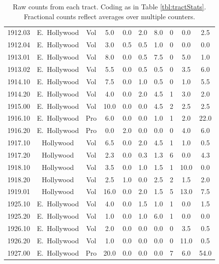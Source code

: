 \documentclass[11pt,twocolumn]{article}
\begin{document}
\begin{table}[]
\begin{tabular}{cccccccccc}
1912.03 & E.~Hollywood & Vol &  5.0 &  0.0 &  2.0 &  8.0 & 0 &  0.0 &  2.5 \\
1912.04 & E.~Hollywood & Vol &  3.0 &  0.5 &  0.5 &  1.0 & 0 &  0.0 &  0.0 \\
1913.01 & E.~Hollywood & Vol &  8.0 &  0.0 &  0.5 &  7.5 & 0 &  5.0 &  1.0 \\
1913.02 & E.~Hollywood & Vol &  5.5 &  0.0 &  0.5 &  0.5 & 0 &  3.5 &  6.0 \\
1914.10 & E.~Hollywood & Vol &  7.5 &  0.0 &  1.0 &  0.5 & 0 &  1.0 &  5.5 \\
1914.20 & E.~Hollywood & Vol &  4.0 &  0.0 &  2.0 &  4.5 & 1 &  3.0 &  2.0 \\
1915.00 & E.~Hollywood & Vol & 10.0 &  0.0 &  0.0 &  4.5 & 2 &  2.5 &  2.5 \\
1916.10 & E.~Hollywood & Pro &  6.0 &  0.0 &  0.0 &  1.0 & 1 &  2.0 & 22.0 \\
1916.20 & E.~Hollywood & Pro &  0.0 &  2.0 &  0.0 &  0.0 & 0 &  4.0 &  6.0 \\
1917.10 & Hollywood & Vol &  6.5 &  0.0 &  2.0 &  4.5 & 1 &  1.0 &  0.5 \\
1917.20 & Hollywood & Vol &  2.3 &  0.0 &  0.3 &  1.3 & 6 &  0.0 &  4.3 \\
1918.10 & Hollywood & Vol &  3.5 &  0.0 &  1.0 &  1.5 & 1 & 10.0 &  0.0 \\
1918.20 & Hollywood & Vol &  2.5 &  1.0 &  0.0 &  2.5 & 2 &  1.5 &  2.0 \\
1919.01 & Hollywood & Vol & 16.0 &  0.0 &  2.0 &  1.5 & 5 & 13.0 &  7.5 \\
1925.10 & E.~Hollywood & Vol &  4.0 &  0.0 &  1.5 &  1.0 & 1 &  0.0 &  1.5 \\
1925.20 & E.~Hollywood & Vol &  1.0 &  0.0 &  1.0 &  6.0 & 1 &  0.0 &  0.0 \\
1926.10 & E.~Hollywood & Vol &  2.0 &  0.0 &  0.0 &  0.0 & 0 &  3.5 &  0.5 \\
1926.20 & E.~Hollywood & Vol &  1.0 &  0.0 &  0.0 &  0.0 & 0 & 11.0 &  0.5 \\
1927.00 & E.~Hollywood & Pro & 20.0 &  0.0 &  0.0 &  0.0 & 7 &  6.0 & 54.0 \\
\bottomrule
\end{tabular}
\caption*{Raw counts from each tract. Coding as in Table \ref{tbl:tractStats}. Fractional counts
reflect averages over multiple counters.}
\label{tbl:allCount}
\end{table}
\end{document}
